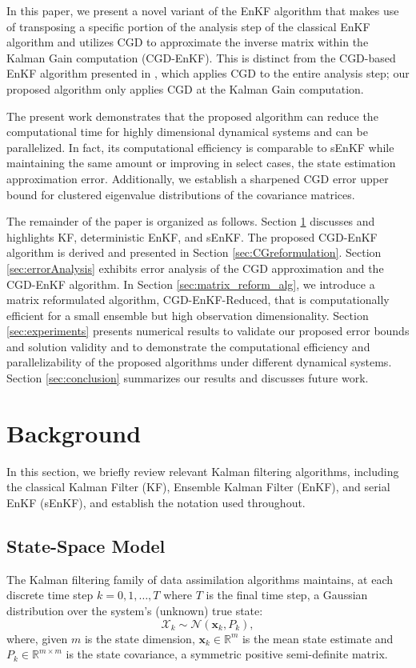 \documentclass[11p]{elsarticle}
\numberwithin{equation}{section}
\newcommand{\vect}[1]{\ensuremath{\bm{#1}}}
\begin{document}
In this paper, we present a novel variant of the EnKF algorithm that makes use of transposing a specific portion of the analysis step of the classical EnKF algorithm and utilizes CGD to approximate the inverse matrix within the Kalman Gain computation (CGD-EnKF).  This is distinct from the CGD-based EnKF algorithm presented in \cite{Bardsley2013, Bardsley2013-2}, which applies CGD to the entire analysis step; our proposed algorithm only applies CGD at the Kalman Gain computation.

The present work demonstrates that the proposed algorithm can reduce the computational time for highly dimensional dynamical systems and can be parallelized.  In fact, its computational efficiency is comparable to sEnKF while maintaining the same amount or improving in select cases, the state estimation approximation error.  Additionally, we establish a sharpened CGD error upper bound for clustered eigenvalue distributions of the covariance matrices.

The remainder of the paper is organized as follows.  Section \ref{sec:methods} discusses and highlights KF, deterministic EnKF, and sEnKF.  The proposed CGD-EnKF algorithm is derived and presented in Section \ref{sec:CGreformulation}.  Section \ref{sec:errorAnalysis} exhibits error analysis of the CGD approximation and the CGD-EnKF algorithm.  In Section \ref{sec:matrix_reform_alg}, we introduce a matrix reformulated algorithm, CGD-EnKF-Reduced, that is computationally efficient for a small ensemble but high observation dimensionality.  Section \ref{sec:experiments} presents numerical results to validate our proposed error bounds and solution validity and to demonstrate the computational efficiency and parallelizability of the proposed algorithms under different dynamical systems.  Section \ref{sec:conclusion} summarizes our results and discusses future work.


\section{Background}
\label{sec:methods}
In this section, we briefly review relevant Kalman filtering algorithms, including the classical Kalman Filter (KF), Ensemble Kalman Filter (EnKF), and serial EnKF (sEnKF), and establish the notation used throughout.


\subsection{State-Space Model}
\label{sec:SSM}
The Kalman filtering family of data assimilation algorithms maintains, at each discrete time step $k=0,1,\dots, T$ where $T$ is the final time step, a Gaussian distribution over the system’s (unknown) true state:
$$
\vect{\mathcal{X}}_k \sim \mathcal{N}(\vect{x}_k, P_k),
$$
where, {given $m$ is the state dimension}, $\vect{x}_k \in \mathbb{R}^m$ is the mean state estimate and $P_k \in \mathbb{R}^{m\times m}$ is the state covariance, a symmetric positive semi-definite matrix.
\end{document}
